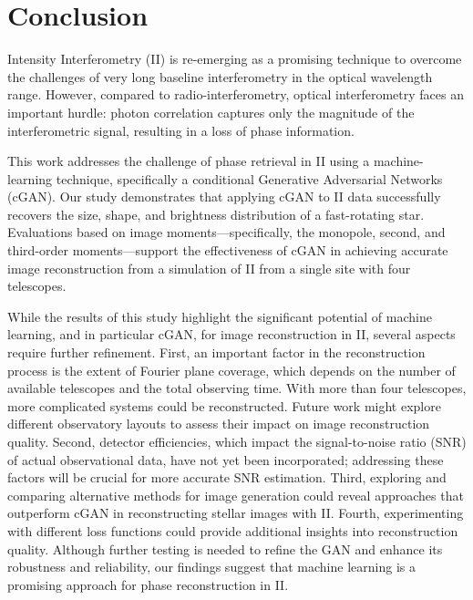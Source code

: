 \section{Conclusion}

Intensity Interferometry (II) is re-emerging as a promising technique to overcome the challenges of very long baseline interferometry in the optical wavelength range.  However, compared to radio-interferometry, optical interferometry faces an important hurdle: photon correlation captures only the magnitude of the interferometric signal, resulting in a loss of phase information.

This work addresses the challenge of phase retrieval in II using a machine-learning technique, specifically a conditional Generative Adversarial Networks (cGAN). Our study demonstrates that applying cGAN to II data successfully recovers the size, shape, and brightness distribution of a fast-rotating star. Evaluations based on image moments—specifically, the monopole, second, and third-order moments—support the effectiveness of cGAN in achieving accurate image reconstruction from a simulation of II from a single site with four telescopes.  

While the results of this study highlight the significant potential of machine learning, and in particular cGAN, for image reconstruction in II, several aspects require further refinement. First, an important factor in the reconstruction process is the extent of Fourier plane coverage, which depends on the number of available telescopes and the total observing time. With more than four telescopes, more complicated systems could be reconstructed. Future work might explore different observatory layouts to assess their impact on image reconstruction quality.  Second, detector efficiencies, which impact the signal-to-noise ratio (SNR) of actual observational data, have not yet been incorporated; addressing these factors will be crucial for more accurate SNR estimation.  Third, exploring and comparing alternative methods for image generation could reveal approaches that outperform cGAN in reconstructing stellar images with II. Fourth, experimenting with different loss functions could provide additional insights into reconstruction quality. Although further testing is needed to refine the GAN and enhance its robustness and reliability, our findings suggest that machine learning is a promising approach for phase reconstruction in II.
